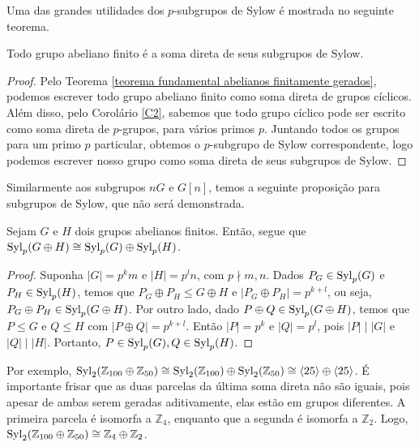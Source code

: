     	\par\vspace{0.3cm} Uma das grandes utilidades dos $p$-subgrupos de Sylow é mostrada no seguinte teorema.
    	\begin{theorem}
    	\label{subgrupos de Sylow e abelianos}
    		Todo grupo abeliano finito é a soma direta de seus subgrupos de Sylow.
    	\end{theorem}
    	\begin{proof}
    		Pelo Teorema \ref{teorema fundamental abelianos finitamente gerados}, podemos escrever 
    		todo grupo abeliano finito como soma direta de grupos cíclicos. Além disso, pelo 
    		Corolário \ref{C2}, sabemos que todo grupo cíclico pode ser escrito como soma direta de $p$-grupos,
    		para vários primos $p$. Juntando todos os grupos para um primo $p$ particular, obtemos o 
    		$p$-subgrupo de Sylow correspondente, logo podemos escrever nosso grupo como soma direta de 
    		seus subgrupos de Sylow.
    	\end{proof}
    	Similarmente aos subgrupos $nG$ e $G[n]$, temos a seguinte proposição para 
    	subgrupos de Sylow, que não será demonstrada.
    	\begin{prop}
    	\label{Sylow da soma direta}
    		Sejam $G$ e $H$ dois grupos abelianos finitos. Então, segue que 
    		$\operatorname{Syl}_p(G\oplus H)\cong \operatorname{Syl}_p(G)\oplus\operatorname{Syl}_p(H)$.
    	\end{prop}
    	\begin{proof}
    	    Suponha $|G| = p^km$ e $|H| = p^ln$, com $p\nmid m,n$. Dados $P_G\in\operatorname{Syl}_p(G)$ e
    	    $P_H \in\operatorname{Syl}_p(H)$, temos que $P_G\oplus P_H \leq G\oplus H$ e 
    	    $|P_G\oplus P_H| = p^{k+l}$, ou seja, $P_G\oplus P_H\in\operatorname{Syl}_p(G\oplus H)$.
    	    Por outro lado, dado $P\oplus Q\in\operatorname{Syl}_p(G\oplus H)$, temos que $P\leq G$ e $Q\leq H$
    	    com $|P\oplus Q| = p^{k+l}$. Então $|P| = p^k$ e $|Q| = p^l$, pois $|P| \mid |G|$ e
    	    $|Q| \mid |H|$. Portanto, $P\in\operatorname{Syl}_p(G), Q\in\operatorname{Syl}_p(H)$.
    	\end{proof}
    	Por exemplo, $\operatorname{Syl}_2(\mathbb{Z}_{100}\oplus\mathbb{Z}_{50}) 
    	\cong \operatorname{Syl}_2(\mathbb{Z}_{100})\oplus\operatorname{Syl}_2(\mathbb{Z}_{50})
    	\cong \langle 25 \rangle \oplus \langle 25 \rangle$. É importante frisar que as duas parcelas 
    	da última soma direta não são iguais, pois apesar de ambas serem geradas aditivamente, elas estão em
    	grupos diferentes. A primeira parcela é isomorfa a $\mathbb{Z}_4$, enquanto que a segunda é isomorfa a
    	$\mathbb{Z}_2$. Logo, $\operatorname{Syl}_2(\mathbb{Z}_{100}\oplus\mathbb{Z}_{50})\cong\mathbb{Z}_4\oplus\mathbb{Z}_2$.
    	
